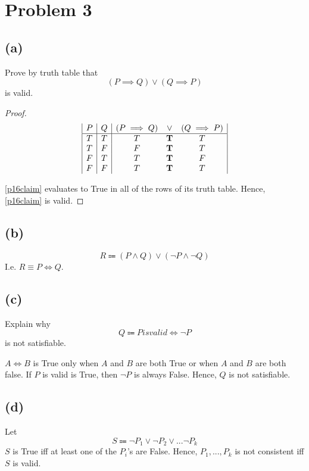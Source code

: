 \documentclass{article}
\begin{document}
\pagebreak

\section{Problem 3}
\subsection{(a)}
Prove by truth table that
\begin{equation}\label{p16claim}
	(P \implies Q) \lor (Q \implies P)
\end{equation}
is valid.
\begin{proof}
	\[
		\begin{array}{|c|c|c c c|}
			P & Q & (P \implies Q) & \lor       & (Q \implies P) \\
			\hline
			T & T & T              & \mathbf{T} & T              \\
			T & F & F              & \mathbf{T} & T              \\
			F & T & T              & \mathbf{T} & F              \\
			F & F & T              & \mathbf{T} & T
		\end{array}
	\]

	\eqref{p16claim} evaluates to True in all of the rows of its truth table. Hence, \eqref{p16claim} is valid.
\end{proof}

\subsection{(b)}
\[
	R \Coloneqq (P \land Q) \lor (\neg P \land \neg Q)
\]
I.e. $R \equiv P \iff Q$.

\subsection{(c)}
Explain why
\[
	Q \Coloneqq P { is valid} \iff \neg P
\]
is not satisfiable.

$A \iff B$ is True only when $A$ and $B$ are both True or when $A$ and $B$ are both false. If $P$ is valid is True, then $\neg P$ is always False. Hence, $Q$ is not satisfiable.

\subsection{(d)}
Let
\[
	S \Coloneqq \neg P_1 \lor \neg P_2 \lor ... \neg P_k
\]
$S$ is True iff at least one of the $P_i$'s are False. Hence, $P_1, ..., P_k$ is not consistent iff $S$ is valid.
\end{document}
